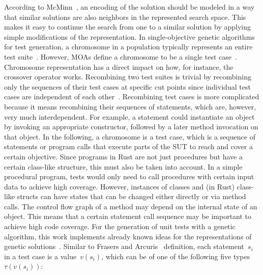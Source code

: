 \documentclass{article}
\begin{document}
According to McMinn~\cite{McMinn_2004}, an encoding of the solution should be modeled in a way that similar solutions are also neighbors in the represented search space. This makes it easy to continue the search from one to a similar solution by applying simple modifications of the representation. In single-objective genetic algorithms for test generation, a chromosome in a population typically represents an entire test suite~\cite{Fraser_2011, Campos2017}. However, \acp{MOA} define a chromosome to be a single test case~\cite{Panichella2018}. Chromosome representation has a direct impact on how, for instance, the crossover operator works. Recombining two test suites is trivial by recombining only the sequences of their test cases at specific cut points since individual test cases are independent of each other~\cite{Fraser_2013}. Recombining test cases is more complicated because it means recombining their sequences of statements, which are, however, very much interdependent. For example, a statement could instantiate an object by invoking an appropriate constructor, followed by a later method invocation on that object. In the following, a chromosome is a test case, which is a sequence of statements or program calls that execute parts of the \ac{SUT} to reach and cover a certain objective. Since programs in Rust are not just procedures but have a certain class-like structure, this must also be taken into account. In a simple procedural program, tests would only need to call procedures with certain input data to achieve high coverage. However, instances of classes and (in Rust) class-like structs can have states that can be changed either directly or via method calls. The control flow graph of a method may depend on the internal state of an object. This means that a certain statement call sequence may be important to achieve high code coverage. For the generation of unit tests with a genetic algorithm, this work implements already known ideas for the representations of genetic solutions~\cite{Fraser2012,Tonella2004,Arcuri2008}. Similar to Frasers and Arcuris~\cite{Fraser_2011} definition, each statement~$s_i$ in a test case is a value~$v(s_i)$, which can be of one of the following five types~$\tau(v(s_i))$: 
\end{document}
